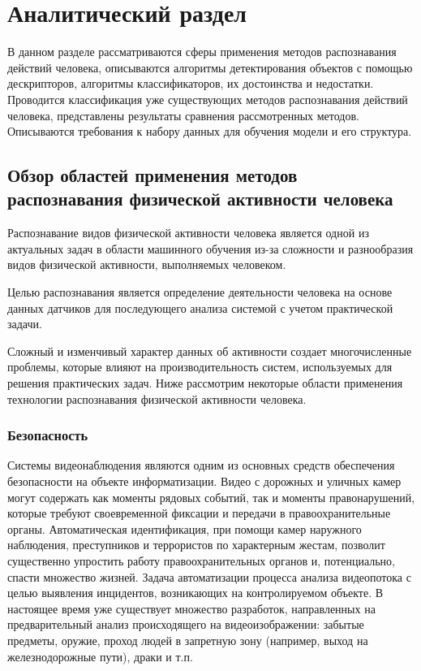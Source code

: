 \chapter{Аналитический раздел}
В данном разделе рассматриваются сферы применения методов распознавания действий человека, описываются 
алгоритмы детектирования объектов с помощью дескрипторов, алгоритмы классификаторов, их достоинства и недостатки.
Проводится классификация уже существующих методов распознавания действий человека, представлены результаты сравнения рассмотренных методов. Описываются требования к набору данных для обучения модели и его структура.

\section{Обзор областей применения методов распознавания физической активности человека}

Распознавание видов физической активности человека является одной из актуальных задач в области машинного обучения из-за сложности и разнообразия видов физической активности, выполняемых человеком.

Целью распознавания является определение деятельности человека на основе данных датчиков для последующего анализа системой с учетом практической задачи.

Сложный и изменчивый характер данных об активности создает многочисленные проблемы, которые влияют на производительность систем, используемых для решения
практических задач. Ниже рассмотрим некоторые области применения технологии распознавания физической активности человека.


\subsection{Безопасность}

Системы видеонаблюдения являются одним из основных средств обеспечения
безопасности на объекте информатизации. Видео с дорожных и уличных камер могут содержать как моменты рядовых событий, так и моменты правонарушений, которые требуют своевременной фиксации и передачи в правоохранительные органы. Автоматическая идентификация, при помощи камер
наружного наблюдения, преступников и террористов по характерным
жестам, позволит существенно упростить работу правоохранительных органов и, потенциально, спасти множество жизней. 
\clearpage
Задача автоматизации процесса анализа видеопотока с целью выявления инцидентов, возникающих на контролируемом объекте. В настоящее время уже существует множество разработок, направленных на предварительный анализ происходящего на видеоизображении: забытые предметы, оружие, проход людей в запретную зону (например, выход на железнодорожные пути), драки и т.п. 

